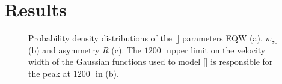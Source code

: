 \section{Results}

\begin{figure}
    \captionsetup[subfigure]{labelformat=empty}
    \centering
    \subfloat[\label{fig:parameter_hists_a}]{}
    \subfloat[\label{fig:parameter_hists_b}]{}
    \subfloat[\label{fig:parameter_hists_c}]{}
    \caption[{Probability density distributions of the [] parameters EQW (a), $w_{80}$ (b) and asymmetry $R$ (c).}]{Probability density distributions of the [] parameters EQW (a), $w_{80}$ (b) and asymmetry $R$ (c). The $1200$\,\kms\, upper limit on the velocity width of the Gaussian functions used to model [] is responsible for the peak at $1200$\,\kms\, in (b).}     
    \label{fig:parameter_hists}
\end{figure}

